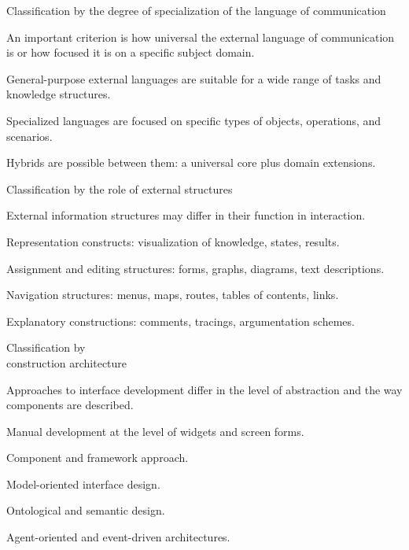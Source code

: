 \begin{frame}{Classification by the degree of specialization of the language of communication}
	\topline
	\justifying
	
	An important criterion is how universal the external language of communication is or how focused it is on a specific subject domain.
	
	\begin{textitemize}
		\item General-purpose external languages are suitable for a wide range of tasks and knowledge structures.
		\item Specialized languages are focused on specific types of objects, operations, and scenarios.
		\item Hybrids are possible between them: a universal core plus domain extensions.
	\end{textitemize}
\end{frame}

\begin{frame}{Classification by the role of external structures}
	\topline
	\justifying
	
	External information structures may differ in their function in interaction.
	
	\begin{textitemize}
		\item Representation constructs: visualization of knowledge, states, results.
		\item Assignment and editing structures: forms, graphs, diagrams, text descriptions.
		\item Navigation structures: menus, maps, routes, tables of contents, links.
		\item Explanatory constructions: comments, tracings, argumentation schemes.
	\end{textitemize}
\end{frame}

\begin{frame}{Classification by\\ construction architecture}
	\topline
	\justifying
	
	Approaches to interface development differ in the level of abstraction and the way components are described.
	
	\begin{textitemize}
		\item Manual development at the level of widgets and screen forms.
		\item Component and framework approach.
		\item Model-oriented interface design.
		\item Ontological and semantic design.
		\item Agent-oriented and event-driven architectures.
	\end{textitemize}
\end{frame}

